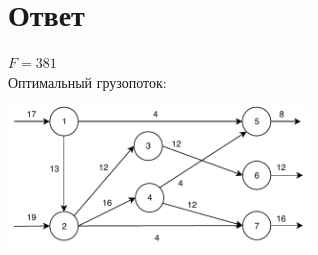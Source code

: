 \documentclass[listings]{labreport}
\begin{document}
\section*{Ответ}

$F = 381$\\

Оптимальный грузопоток:

\includegraphics[width=0.6\textwidth]{graph3.pdf}
\end{document}
